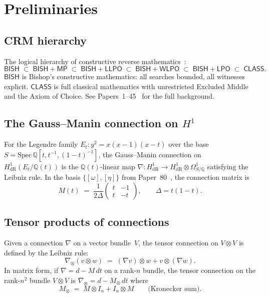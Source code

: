 \documentclass[11pt]{article}
\theoremstyle{plain}
\theoremstyle{definition}
\theoremstyle{remark}
\newcommand{\Q}{\mathbb{Q}}
\newcommand{\BISH}{\mathsf{BISH}}
\newcommand{\LPO}{\mathsf{LPO}}
\newcommand{\WLPO}{\mathsf{WLPO}}
\newcommand{\LLPO}{\mathsf{LLPO}}
\newcommand{\MP}{\mathsf{MP}}
\newcommand{\CLASS}{\mathsf{CLASS}}
\newcommand{\HdR}{H^1_{\mathrm{dR}}}
\begin{document}
\section{Preliminaries}\label{sec:prelim}

\subsection{CRM hierarchy}

The logical hierarchy of constructive reverse
mathematics~\cite{BridgesRichman1987,Paper50}:
\[
\BISH \;\subset\; \BISH + \MP \;\subset\; \BISH + \LLPO
\;\subset\; \BISH + \WLPO \;\subset\; \BISH + \LPO
\;\subset\; \CLASS.
\]
$\BISH$ is Bishop's constructive mathematics: all searches
bounded, all witnesses explicit.
$\CLASS$ is full classical mathematics with unrestricted
Excluded Middle and the Axiom of Choice.
See Papers~1--45~\cite{Paper50} for the full background.

\subsection{The Gauss--Manin connection on \texorpdfstring{$H^1$}{H1}}

For the Legendre family $E_t : y^2 = x(x-1)(x-t)$ over the
base $S = \mathrm{Spec}\,\Q[t, t^{-1}, (1-t)^{-1}]$,
the Gauss--Manin connection on $\HdR(E_t/\Q(t))$ is the
$\Q(t)$-linear map
$\nabla : \HdR \to \HdR \otimes \Omega^1_{S/\Q}$
satisfying the Leibniz rule.
In the basis $\{[\omega], [\eta]\}$ from
Paper~80~\cite{Paper80}, the connection matrix is
\[
M(t) \;=\; \frac{1}{2\Delta}
\begin{pmatrix} t & -1 \\ t & -t \end{pmatrix},
\qquad \Delta = t(1-t).
\]

\subsection{Tensor products of connections}\label{sec:tensor}

Given a connection $\nabla$ on a vector bundle~$V$,
the tensor connection on $V \otimes V$ is defined by the
Leibniz rule:
\[
\nabla_{\otimes}(v \otimes w)
\;=\; (\nabla v) \otimes w + v \otimes (\nabla w).
\]
In matrix form, if $\nabla = d - M\,dt$ on a rank-$n$
bundle, the tensor connection on the rank-$n^2$ bundle
$V \otimes V$ is $\nabla_{\otimes} = d - M_{\otimes}\,dt$
where
\[
M_{\otimes} \;=\; M \otimes I_n + I_n \otimes M
\qquad \text{(Kronecker sum)}.
\]
\end{document}

